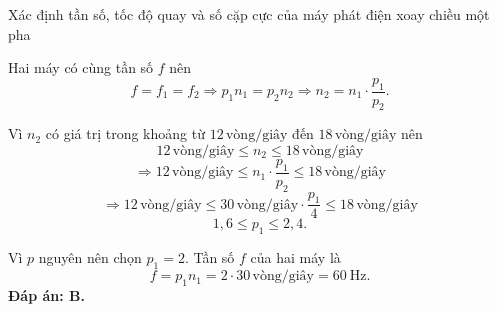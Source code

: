 \begin{dang}{Xác định tần số, tốc độ quay và số cặp cực của máy phát điện xoay chiều một pha}
{		Hai máy có cùng tần số $f$ nên
		\begin{equation*}
			f=f_1=f_2\Rightarrow p_1n_1=p_2n_2\Rightarrow n_2= n_1\cdot\dfrac{p_1}{p_2}.
		\end{equation*}
		
		Vì $n_2$ có giá trị trong khoảng từ $12\,\text{vòng/giây}$ đến $18\,\text{vòng/giây}$ nên
		\begin{equation*}
			12\,\text{vòng/giây} \leq n_2 \leq 18\,\text{vòng/giây}
		\end{equation*}
		\begin{equation*}
			\Rightarrow 12\,\text{vòng/giây} \leq n_1\cdot\dfrac{p_1}{p_2} \leq 18\,\text{vòng/giây}
		\end{equation*}
		\begin{equation*}
			\Rightarrow 12\,\text{vòng/giây} \leq 30\,\text{vòng/giây}\cdot\dfrac{p_1}{4} \leq 18\,\text{vòng/giây}
		\end{equation*}
		\begin{equation*}
			1,6 \leq p_1 \leq 2,4.
		\end{equation*}
		
		Vì $p$ nguyên nên chọn $p_1=2$.
		Tần số $f$ của hai máy là
		\begin{equation*}
			f=p_1 n_1= 2\cdot 30\,\text{vòng/giây} = \SI{60}{\hertz}.
		\end{equation*}
		\textbf{Đáp án: B.}
	}
\end{dang}
